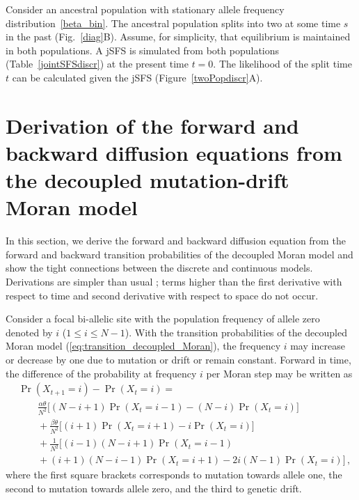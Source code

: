 \documentclass[preprint]{elsarticle}
\newcommand\x[1]{\ensuremath{X_{#1}}}
\begin{document}
Consider an ancestral population with stationary allele frequency distribution~\eqref{beta_bin}. The ancestral population splits into two at some time $s$ in the past (Fig.~\ref{diag}B). Assume, for simplicity, that equilibrium is maintained in both populations. A jSFS is simulated from both populations (Table~\ref{jointSFSdiscr}) at the present time $t=0$. The likelihood of the split time $t$ can be calculated given the jSFS (Figure~\ref{twoPopdiscr}A).


\section{Derivation of the forward and backward diffusion equations from the decoupled mutation-drift Moran model}\label{diffDer}

In this section, we derive the forward and backward diffusion equation from the forward and backward transition probabilities of the decoupled Moran model and show the tight connections between the discrete and continuous models. Derivations are simpler than usual \citep{Ewen04}; terms higher than the first derivative with respect to time and second derivative with respect to space do not occur. 

Consider a focal bi-allelic site with the population frequency of allele zero denoted by $i$ ($1 \leq i \leq N-1$). With the transition probabilities of the decoupled Moran model (\ref{eq:transition_decoupled_Moran}), the frequency $i$ may increase or decrease by one due to mutation or drift or remain constant. Forward in time, the difference of the probability at frequency $i$ per Moran step may be written as
\begin{equation}\label{eq:forw_discr_mutation}
\begin{split}
&\Pr(\x{t+1}=i)-\Pr(\x{t}=i) = \\
&\qquad \frac{\alpha\theta}{N^2} \bigg[(N-i+1)\Pr(\x{t}=i-1) - (N-i)\Pr(\x{t}=i)\bigg]\\
&\qquad+\frac{\beta\theta}{N^2} \bigg[(i+1)\Pr(\x{t}=i+1) - i\Pr(\x{t}=i)\bigg]\\
&\qquad+\frac1{N^2}\bigg[(i-1)(N-i+1)\Pr(\x{t}=i-1) \\
&\qquad+ (i+1)(N-i-1)\Pr(\x{t}=i+1)-2i(N-1)\Pr(\x{t}=i)\bigg]\,,
\end{split}
\end{equation}
where the first square brackets corresponds to mutation towards allele one, the second to mutation towards allele zero, and the third to genetic drift.
\end{document}
